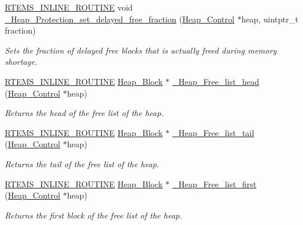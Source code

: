 \begin{DoxyCompactItemize}
\mbox{\hyperlink{group__RTEMSScoreBaseDefs_gac216239df231d5dbd15e3520b0b9313f}{R\+T\+E\+M\+S\+\_\+\+I\+N\+L\+I\+N\+E\+\_\+\+R\+O\+U\+T\+I\+NE}} void \mbox{\hyperlink{group__RTEMSScoreHeap_gad616af34405ce4473f9ff3050ce39d90}{\+\_\+\+Heap\+\_\+\+Protection\+\_\+set\+\_\+delayed\+\_\+free\+\_\+fraction}} (\mbox{\hyperlink{structHeap__Control}{Heap\+\_\+\+Control}} $\ast$heap, uintptr\+\_\+t fraction)
\begin{DoxyCompactList}\small\item\em Sets the fraction of delayed free blocks that is actually freed during memory shortage. \end{DoxyCompactList}\item 
\mbox{\hyperlink{group__RTEMSScoreBaseDefs_gac216239df231d5dbd15e3520b0b9313f}{R\+T\+E\+M\+S\+\_\+\+I\+N\+L\+I\+N\+E\+\_\+\+R\+O\+U\+T\+I\+NE}} \mbox{\hyperlink{structHeap__Block}{Heap\+\_\+\+Block}} $\ast$ \mbox{\hyperlink{group__RTEMSScoreHeap_ga860e7959de03ba830d0ebe1b4cca8273}{\+\_\+\+Heap\+\_\+\+Free\+\_\+list\+\_\+head}} (\mbox{\hyperlink{structHeap__Control}{Heap\+\_\+\+Control}} $\ast$heap)
\begin{DoxyCompactList}\small\item\em Returns the head of the free list of the heap. \end{DoxyCompactList}\item 
\mbox{\hyperlink{group__RTEMSScoreBaseDefs_gac216239df231d5dbd15e3520b0b9313f}{R\+T\+E\+M\+S\+\_\+\+I\+N\+L\+I\+N\+E\+\_\+\+R\+O\+U\+T\+I\+NE}} \mbox{\hyperlink{structHeap__Block}{Heap\+\_\+\+Block}} $\ast$ \mbox{\hyperlink{group__RTEMSScoreHeap_gad25276de4aa987568f1bfc66a0c66700}{\+\_\+\+Heap\+\_\+\+Free\+\_\+list\+\_\+tail}} (\mbox{\hyperlink{structHeap__Control}{Heap\+\_\+\+Control}} $\ast$heap)
\begin{DoxyCompactList}\small\item\em Returns the tail of the free list of the heap. \end{DoxyCompactList}\item 
\mbox{\hyperlink{group__RTEMSScoreBaseDefs_gac216239df231d5dbd15e3520b0b9313f}{R\+T\+E\+M\+S\+\_\+\+I\+N\+L\+I\+N\+E\+\_\+\+R\+O\+U\+T\+I\+NE}} \mbox{\hyperlink{structHeap__Block}{Heap\+\_\+\+Block}} $\ast$ \mbox{\hyperlink{group__RTEMSScoreHeap_ga0299809a91130b3da718ee889f4fe43d}{\+\_\+\+Heap\+\_\+\+Free\+\_\+list\+\_\+first}} (\mbox{\hyperlink{structHeap__Control}{Heap\+\_\+\+Control}} $\ast$heap)
\begin{DoxyCompactList}\small\item\em Returns the first block of the free list of the heap. \end{DoxyCompactList}\item 

\end{DoxyCompactItemize}
